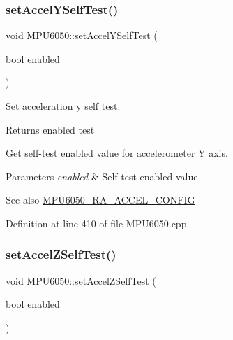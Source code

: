 \subsubsection{\texorpdfstring{setAccelYSelfTest()}{setAccelYSelfTest()}}
{\footnotesize\ttfamily void M\+P\+U6050\+::set\+Accel\+Y\+Self\+Test (\begin{DoxyParamCaption}\item[{bool}]{enabled }\end{DoxyParamCaption})}

Set acceleration y self test.

\begin{DoxyReturn}{Returns}
enabled test
\end{DoxyReturn}
Get self-\/test enabled value for accelerometer Y axis. 
\begin{DoxyParams}{Parameters}
{\em enabled} & Self-\/test enabled value \\
\hline
\end{DoxyParams}
\begin{DoxySeeAlso}{See also}
\mbox{\hyperlink{MPU6050_8h_a48b7d7b24a70b247e373bc5965a5dcc7}{M\+P\+U6050\+\_\+\+R\+A\+\_\+\+A\+C\+C\+E\+L\+\_\+\+C\+O\+N\+F\+IG}} 
\end{DoxySeeAlso}


Definition at line 410 of file M\+P\+U6050.\+cpp.


\begin{DoxyCode}{0}

\end{DoxyCode}
\mbox{\label{classMPU6050_a8eb8ba039af9a47e0475a3835b87f404}} 
\subsubsection{\texorpdfstring{setAccelZSelfTest()}{setAccelZSelfTest()}}
{\footnotesize\ttfamily void M\+P\+U6050\+::set\+Accel\+Z\+Self\+Test (\begin{DoxyParamCaption}\item[{bool}]{enabled }\end{DoxyParamCaption})}

